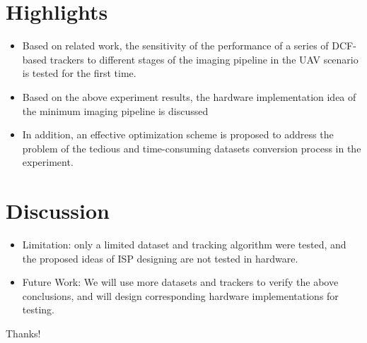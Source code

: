 \documentclass{beamer}
\begin{document}
\section{Highlights}

\begin{frame}
    \begin{itemize}[<+-| alert@+>]
        \item Based on related work, the sensitivity of the performance of a series of DCF-based trackers to different stages of the imaging pipeline in the UAV scenario is tested for the first time.
        \item Based on the above experiment results, the hardware implementation idea of the minimum imaging pipeline is discussed
        \item In addition, an effective optimization scheme is proposed to address the problem of the tedious and time-consuming datasets conversion process in the experiment.
    \end{itemize}
\end{frame}

\section{Discussion}

\begin{frame}
    \begin{itemize}[<+-| alert@+>]
        \item Limitation: only a limited dataset and tracking algorithm were tested, and the proposed ideas of ISP designing are not tested in hardware.
        \item Future Work: We will use more datasets and trackers to verify the above conclusions, and will design corresponding hardware implementations for testing.
    \end{itemize}
\end{frame}

\begin{frame}
    \begin{center}
        {\Huge\calligra Thanks!}
    \end{center}
\end{frame}
\end{document}
